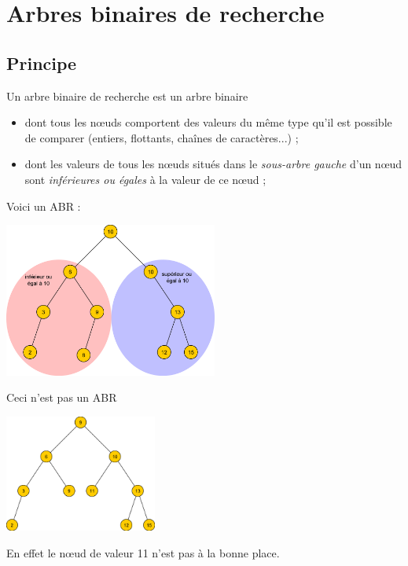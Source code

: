 \documentclass[10pt,firamath,cours]{nsi}
\begin{document}
\setcounter{chapter}{12}
\chapter{Arbres binaires de recherche}
\section{Principe}
\begin{definition}[]
    Un arbre binaire de recherche est un arbre binaire
    \begin{itemize}
        \item dont tous les n\oe uds comportent des valeurs du même type qu'il est possible de comparer (entiers, flottants, chaînes de caractères...) ;
        \item dont les valeurs de tous les n\oe uds situés dans le \textit{sous-arbre gauche} d'un n\oe ud sont \textit{inférieures ou égales} à la valeur de ce n\oe ud ;
    \end{itemize}   
\end{definition}
\begin{exemple}[s]
    Voici un ABR :
    \begin{center}
    \includegraphics[width=7cm]{img/abr1}
    \end{center} 
    Ceci n'est pas un ABR
    \begin{center}
        \includegraphics[width=5cm]{img/abr2}
    \end{center}
    En effet le nœud de valeur 11 n'est pas à la bonne place.
\end{exemple}
\end{document}
